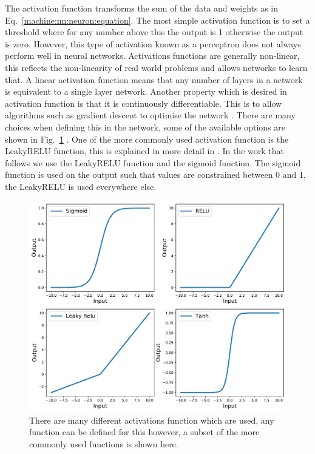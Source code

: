 The activation function transforms the sum of the data and weights as in Eq.~\ref{machine:nn:neuron:equation}. 
The most simple activation function is to set a threshold where for any number above this the output is 1 otherwise the output is zero. However, this type of activation known as a perceptron does not always perform well in neural networks.
Activations functions are generally non-linear, this reflects the non-linearity of real world problems and allows networks to learn that. 
A linear activation function means that any number of layers in a network is equivalent to a single layer network.
Another property which is desired in activation function is that it is continuously differentiable. This is to allow algorithms such as gradient descent to optimise the network \citep{nwankpa2018ActivationFunctions}. 
There are many choices when defining this in the network, some of the available options are shown in Fig.~\ref{machine:nn:activation:plot} \citep{nwankpa2018ActivationFunctions}.
One of the more commonly used activation function is the LeakyRELU function, this is explained in more detail in \citep{maas2013RectifierNonlinearities}.
In the work that follows we use the LeakyRELU function and the sigmoid function.
The sigmoid function is used on the output such that values are constrained between 0 and 1, the LeakyRELU is used everywhere else. 


\begin{figure}[ht]
	\centering
	\includegraphics[width=0.8\columnwidth]{C4_cnn/activations.pdf}
	\caption[Examples of activation functions.]{There are many different activations function which are used, any function can be defined for this however, a subset of the more commonly used functions is shown here.}
	\label{machine:nn:activation:plot}
\end{figure}





